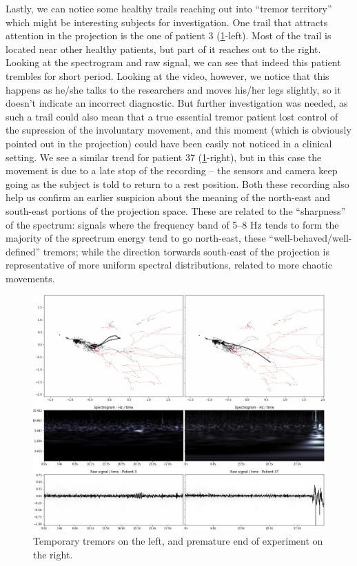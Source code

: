Lastly, we can notice some healthy trails reaching out into ``tremor territory'' which might be interesting subjects for investigation. One trail that attracts attention in the projection is the one of patient 3 (\cref{fig:exp1-337}-left). Most of the trail is located near other healthy patients, but part of it reaches out to the right. Looking at the spectrogram and raw signal, we can see that indeed this patient trembles for short period. Looking at the video, however, we notice that this happens as he/she talks to the researchers and moves his/her legs slightly, so it doesn't indicate an incorrect diagnostic. But further investigation was needed, as such a trail could also mean that a true essential tremor patient lost control of the supression of the involuntary movement, and this moment (which is obviously pointed out in the projection) could have been easily not noticed in a clinical setting. We see a similar trend for patient 37 (\cref{fig:exp1-337}-right), but in this case the movement is due to a late stop of the recording -- the sensors and camera keep going as the subject is told to return to a rest position. Both these recording also help us confirm an earlier suspicion about the meaning of the north-east and south-east portions of the projection space. These are related to the ``sharpness'' of the spectrum: signals where the frequency band of 5--8 Hz tends to form the majority of the sprectrum energy tend to go north-east, these ``well-behaved/well-defined'' tremors; while the direction torwards south-east of the projection is representative of more uniform spectral distributions, related to more chaotic movements.

\begin{figure}[ht]
\centering
\includegraphics[width=\linewidth]{figures/nemo/exp1-337.png}
\caption{Temporary tremors on the left, and premature end of experiment on the right.}
\label{fig:exp1-337}
\end{figure}

